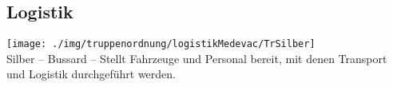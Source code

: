\subsection{Logistik}
\texttt{[image: ./img/truppenordnung/logistikMedevac/TrSilber]}\\
Silber -- Bussard -- Stellt Fahrzeuge und Personal bereit, mit denen Transport und Logistik durchgeführt werden.